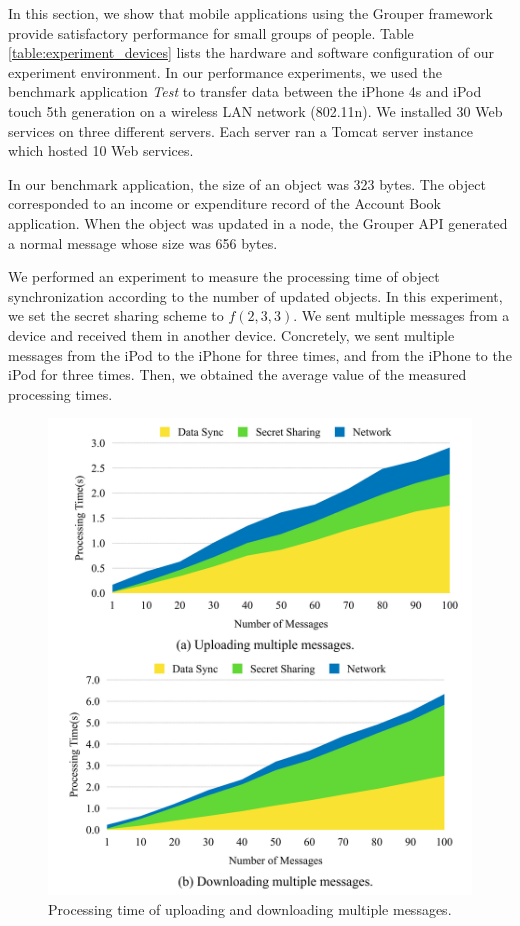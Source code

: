 \documentclass[a4paper,11pt]{report}
\begin{document}
In this section, we show that mobile applications using the Grouper framework provide satisfactory performance for small groups of people.
Table \ref{table:experiment_devices} lists the hardware and software configuration of our experiment environment.
In our performance experiments, we used the benchmark application \emph{Test} to transfer data between the iPhone 4s and iPod touch 5th generation on a wireless LAN network (802.11n).
We installed 30 Web services on three different servers.
Each server ran a Tomcat server instance which hosted 10 Web services.

In our benchmark application, the size of an object was 323 bytes.
The object corresponded to an income or expenditure record of the Account Book application.
When the object was updated in a node, the Grouper API generated a normal message whose size was 656 bytes.

We performed an experiment to measure the processing time of object synchronization according to the number of updated objects.
In this experiment, we set the secret sharing scheme to ${f(2, 3, 3)}$.
We sent multiple messages from a device and received them in another device. 
Concretely, we sent multiple messages from the iPod to the iPhone for three times, and from the iPhone to the iPod for three times.
Then, we obtained the average value of the measured processing times.

\begin{figure}[t]
	\centering
	\includegraphics[scale=0.15]{multiple_messages}
	\caption{Processing time of uploading and downloading multiple messages.}
	\label{fig:processing_time_multiple_message}
\end{figure}
\end{document}
